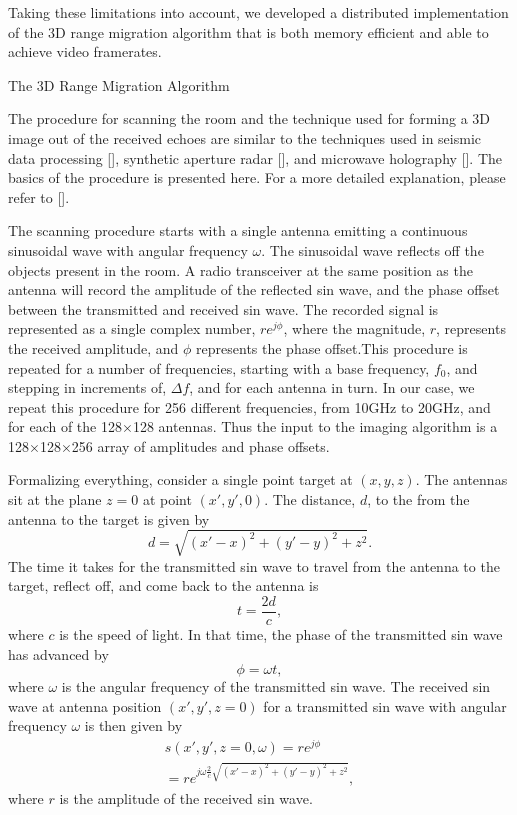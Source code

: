 \documentclass[twocolumn]{article}
\makeatletter
\def\section{\@startsection{section}{1}{\z@}{24pt plus 2 pt
minus 2 pt} {12pt plus 2pt minus 2pt}{\large\bf}}
\makeatother
\begin{document}
Taking these limitations into account, we developed a distributed implementation of the 3D range migration algorithm that is both memory efficient and able to achieve video framerates.

\section{The 3D Range Migration Algorithm}

The procedure for scanning the room and the technique used for forming a 3D image out of the received echoes are similar to the techniques used in seismic data processing [], synthetic aperture radar [], and microwave holography []. The basics of the procedure is presented here. For a more detailed explanation, please refer to [].

The scanning procedure starts with a single antenna emitting a continuous sinusoidal wave with angular frequency $\omega$. The sinusoidal wave reflects off the objects present in the room. A radio transceiver at the same position as the antenna will record the amplitude of the reflected sin wave, and the phase offset between the transmitted and received sin wave. The recorded signal is represented as a single complex number, $re^{j\phi}$, where the magnitude, $r$, represents the received amplitude, and $\phi$ represents the phase offset.This procedure is repeated for a number of frequencies, starting with a base frequency, $f_0$, and stepping in increments of, $\Delta f$, and for each antenna in turn. In our case, we repeat this procedure for 256 different frequencies, from 10GHz to 20GHz, and for each of the 128$\times$128 antennas. Thus the input to the imaging algorithm is a 128$\times$128$\times$256 array of amplitudes and phase offsets.

Formalizing everything, consider a single point target at $(x,y,z)$. The antennas sit at the plane $z=0$ at point $(x',y',0)$. The distance, $d$, to the from the antenna to the target is given by
\[
d=\sqrt{(x'-x)^{2}+(y'-y)^{2}+z^{2}}.
\]
The time it takes for the transmitted sin wave to travel from the antenna to the target, reflect off, and come back to the antenna is
 \[
t=\frac{2d}{c},
\]
where $c$ is the speed of light. In that time, the phase of the transmitted sin wave has advanced by
\[
\phi = \omega t,
\]
where $\omega$ is the angular frequency of the transmitted sin wave. The received sin wave at antenna position $(x',y',z=0)$ for a transmitted sin wave with angular frequency $\omega$ is then given by
\begin{gather}
s(x',y',z=0,\omega) = re^{j\phi} \\
	= re^{j \omega \frac{2}{c} \sqrt{(x'-x)^2 + (y'-y)^2 + z^2}},
\end{gather}
where $r$ is the amplitude of the received sin wave.
\end{document}
